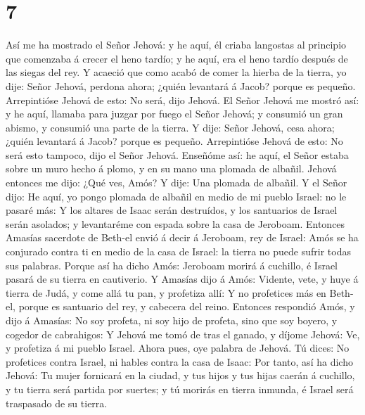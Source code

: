 \hypertarget{section-6}{%
\section{7}\label{section-6}}

 Así me ha mostrado el Señor Jehová: y he aquí, él criaba
langostas al principio que comenzaba á crecer el heno tardío; y he aquí,
era el heno tardío después de las siegas del rey.  Y
acaeció que como acabó de comer la hierba de la tierra, yo dije: Señor
Jehová, perdona ahora; ¿quién levantará á Jacob? porque es pequeño.
 Arrepintióse Jehová de esto: No será, dijo Jehová.
 El Señor Jehová me mostró así: y he aquí, llamaba para
juzgar por fuego el Señor Jehová; y consumió un gran abismo, y consumió
una parte de la tierra.  Y dije: Señor Jehová, cesa ahora;
¿quién levantará á Jacob? porque es pequeño.  Arrepintióse
Jehová de esto: No será esto tampoco, dijo el Señor Jehová.
 Enseñóme así: he aquí, el Señor estaba sobre un muro
hecho á plomo, y en su mano una plomada de albañil. 
Jehová entonces me dijo: ¿Qué ves, Amós? Y dije: Una plomada de albañil.
Y el Señor dijo: He aquí, yo pongo plomada de albañil en medio de mi
pueblo Israel: no le pasaré más:  Y los altares de Isaac
serán destruídos, y los santuarios de Israel serán asolados; y
levantaréme con espada sobre la casa de Jeroboam. 
Entonces Amasías sacerdote de Beth-el envió á decir á Jeroboam, rey de
Israel: Amós se ha conjurado contra ti en medio de la casa de Israel: la
tierra no puede sufrir todas sus palabras.  Porque así ha
dicho Amós: Jeroboam morirá á cuchillo, é Israel pasará de su tierra en
cautiverio.  Y Amasías dijo á Amós: Vidente, vete, y huye
á tierra de Judá, y come allá tu pan, y profetiza allí: 
Y no profetices más en Beth-el, porque es santuario del rey, y cabecera
del reino.  Entonces respondió Amós, y dijo á Amasías: No
soy profeta, ni soy hijo de profeta, sino que soy boyero, y cogedor de
cabrahigos:  Y Jehová me tomó de tras el ganado, y díjome
Jehová: Ve, y profetiza á mi pueblo Israel.  Ahora pues,
oye palabra de Jehová. Tú dices: No profetices contra Israel, ni hables
contra la casa de Isaac:  Por tanto, así ha dicho Jehová:
Tu mujer fornicará en la ciudad, y tus hijos y tus hijas caerán á
cuchillo, y tu tierra será partida por suertes; y tú morirás en tierra
inmunda, é Israel será traspasado de su tierra.


